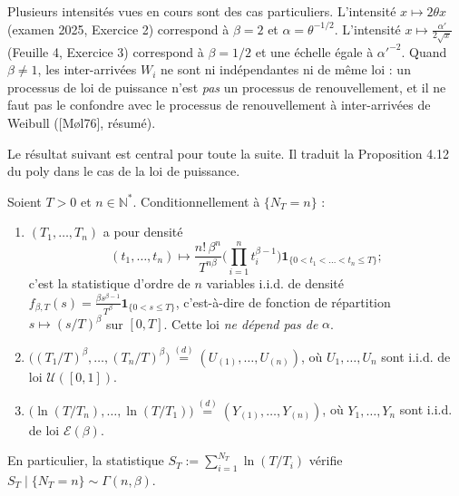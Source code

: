 \begin{remarque}
Plusieurs intensités vues en cours sont des cas particuliers. L'intensité $x\mapsto2\theta x$ (examen 2025, Exercice 2) correspond à $\beta=2$ et $\alpha=\theta^{-1/2}$. L'intensité $x\mapsto\frac{\alpha'}{2\sqrt{x}}$ (Feuille 4, Exercice 3) correspond à $\beta=1/2$ et une échelle égale à $\alpha'^{-2}$. Quand $\beta\neq1$, les inter-arrivées $W_i$ ne sont ni indépendantes ni de même loi : un processus de loi de puissance n'est \emph{pas} un processus de renouvellement, et il ne faut pas le confondre avec le processus de renouvellement à inter-arrivées de Weibull ([Møl76], résumé).
\end{remarque}

Le résultat suivant est central pour toute la suite. Il traduit la Proposition 4.12 du poly dans le cas de la loi de puissance.

\begin{proposition}\label{prop:loicond}
Soient $T>0$ et $n\in\mathbb{N}^*$. Conditionnellement à $\{N_T=n\}$ :
\begin{enumerate}
\item $(T_1,\dots,T_n)$ a pour densité
\[
(t_1,\dots,t_n)\mapsto\frac{n!\,\beta^n}{T^{n\beta}}\Big(\prod_{i=1}^n t_i^{\beta-1}\Big)\mathbf{1}_{\{0<t_1<\dots<t_n\le T\}} ;
\]
c'est la statistique d'ordre de $n$ variables i.i.d. de densité $f_{\beta,T}(s)=\frac{\beta s^{\beta-1}}{T^\beta}\mathbf{1}_{\{0<s\le T\}}$, c'est-à-dire de fonction de répartition $s\mapsto(s/T)^\beta$ sur $[0,T]$. Cette loi \emph{ne dépend pas de} $\alpha$.
\item $\big((T_1/T)^\beta,\dots,(T_n/T)^\beta\big)\overset{(d)}{=}(U_{(1)},\dots,U_{(n)})$, où $U_1,\dots,U_n$ sont i.i.d. de loi $\mathcal{U}([0,1])$.
\item $\big(\ln(T/T_n),\dots,\ln(T/T_1)\big)\overset{(d)}{=}(Y_{(1)},\dots,Y_{(n)})$, où $Y_1,\dots,Y_n$ sont i.i.d. de loi $\mathcal{E}(\beta)$.
\end{enumerate}
En particulier, la statistique $S_T:=\sum_{i=1}^{N_T}\ln(T/T_i)$ vérifie $S_T\mid\{N_T=n\}\sim\Gamma(n,\beta)$.
\end{proposition}

